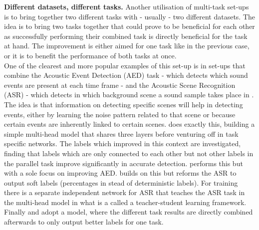 \textbf{Different datasets, different tasks.} Another utilisation of multi-task set-ups is to bring together two different tasks with - usually - two different datasets. The idea is to bring two tasks together that could prove to be beneficial for each other as successfully performing their combined task is directly beneficial for the task at hand. The improvement is either aimed for one task like in the previous case, or it is to benefit the performance of both tasks at once. \\

One of the clearest and more popular examples of this set-up is in set-ups that combine the Acoustic Event Detection (AED) task - which detects which sound events are present at each time frame - and the Acoustic Scene Recognition (ASR) - which detects in which background scene a sound sample takes place in \citep{tonami2019joint} \citep{xu2019multi} \citep{imoto2020sound} \citep{jung2020acoustic} \citep{komatsu2020scene}. The idea is that information on detecting specific scenes will help in detecting events, either by learning the noise pattern related to that scene or because certain events are inherently linked to certain scenes. \cite{tonami2019joint} does exactly this, building a simple multi-head model that shares three layers before venturing off in task specific networks. The labels which improved in this context are investigated, finding that labels which are only connected to each other but not other labels in the parallel task improve significantly in accurate detection. \cite{xu2019multi} performs this but with a sole focus on improving AED. \cite{imoto2020sound} builds on this but reforms the ASR to output soft labels (percentages in stead of deterministic labels). For training there is a separate independent network for ASR that teaches the ASR task in the multi-head model in what is a called a teacher-student learning framework. Finally \citep{jung2020acoustic} and \citep{komatsu2020scene} adopt a model, where the different task results are directly combined afterwards to only output better labels for one task.\\

